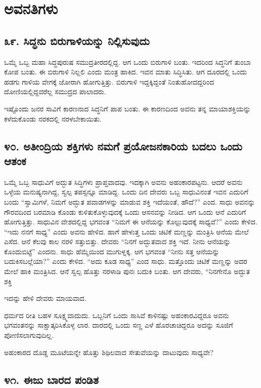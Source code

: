 \chapter{ಅವನತಿಗಳು}

\section{\num{೩೯. } ಸಿದ್ಧನು ಬಿರುಗಾಳಿಯನ್ನು ನಿಲ್ಲಿಸುವುದು}

ಒಮ್ಮೆ ಒಬ್ಬ ಮಹಾ ಸಿದ್ಧಪುರುಷ ಸಮುದ್ರತೀರದಲ್ಲಿದ್ದ. ಆಗ ಒಂದು ಬಿರುಗಾಳಿ ಬಂತು. ಇದರಿಂದ ಸಿದ್ಧನಿಗೆ ತುಂಬಾ ಕೋಪ ಬಂತು. ಈ ಬಿರುಗಾಳಿ ನಿಲ್ಲಲಿ ಎಂದು ಮಂತ್ರ ಹಾಕಿದ. ಇವನ ಮಾತು ಸಿದ್ಧಿಸಿತು. ಆಗ ದೂರದಲ್ಲಿ ಒಂದು ಹಡಗು ಗಾಳಿಯ ವೇಗಕ್ಕೆ ಜೋರಾಗಿ ಹೋಗುತ್ತಿತ್ತು. ಬಿರುಗಾಳಿ ಇದ್ದಕ್ಕಿದ್ದಂತೆ ನಿಂತುಹೋದದ್ದರಿಂದ ದೋಣಿಯಲ್ಲಿದ್ದವರೆಲ್ಲ ಸಮುದ್ರದ ಪಾಲಾದರು.

ಇಷ್ಟೊಂದು ಜನರ ಸಾವಿಗೆ ಕಾರಣನಾದ ಸಿದ್ಧನಿಗೆ ಪಾಪ ಬಂತು. ಈ ಕಾರಣದಿಂದ ಅವನು ತನ್ನ ಮಾಯಾಶಕ್ತಿಯನ್ನು ಕಳೆದುಕೊಂಡು ನರಕದಲ್ಲಿ ನರಳಬೇಕಾಯಿತು.


\section{\num{೪೦. } ಅತೀಂದ್ರಿಯ ಶಕ್ತಿಗಳು ನಮಗೆ ಪ್ರಯೋಜನಕಾರಿಯ ಬದಲು ಒಂದು ಆತಂಕ}

ಒಮ್ಮೆ ಒಬ್ಬ ಸಾಧುವಿಗೆ ಅದ್ಭುತ ಸಿದ್ಧಿಗಳು ಪ್ರಾಪ್ತವಾದವು. ಇದಕ್ಕಾಗಿ ಅವನು ಅಹಂಕಾರಪಟ್ಟನು. ಆದರೆ ಅವನು ಒಳ್ಳೆಯ ಮನುಷ್ಯನಾಗಿದ್ದ, ಸ್ವಲ್ಪ ತಪಸ್ಸನ್ನೂ ಮಾಡಿದ್ದ. ಒಂದು ದಿನ ದೇವರು ಒಬ್ಬ ಸಾಧುವಿನಂತೆ ಇವನ ಎದುರಿಗೆ ಬಂದು “ಸ್ವಾಮಿಗಳೆ, ನಿಮಗೆ ಅದ್ಭುತ ಪವಾಡಗಳನ್ನು ಮಾಡುವ ಶಕ್ತಿ ಇದೆಯಂತೆ, ಹೌದೆ?” ಎಂದ. ಸಾಧು ಅವನನ್ನು ಗೌರವದಿಂದ ಬರಮಾಡಿ ಕೊಂಡು ಕುಳಿತುಕೊಳ್ಳುವುದಕ್ಕೆ ಒಂದು ಆಸನವನ್ನು ನೀಡಿದ. ಆಗ ಒಂದು ಆನೆ ಎದುರಿಗೆ ಹೋಗುತ್ತಿತ್ತು. ಸಾಧುವಿನ ವೇಶದಲ್ಲಿದ್ದ ಭಗವಂತ “ನಿಮಗೆ ಈ ಆನೆಯನ್ನು ಕೊಲ್ಲುವುದಕ್ಕೆ ಸಾಧ್ಯವೆ?” ಎಂದು ಕೇಳಿದ. “ಇದು ನನಗೆ ಸಾಧ್ಯ” ಎಂದು ಅವನು ಹೇಳಿದ. ಹಾಗೆ ಹೇಳುತ್ತ ಒಂದು ಚಿಟಿಕೆ ಮಣ್ಣನ್ನು ಮಂತ್ರಿಸಿ ಆನೆಯ ಮೇಲೆ ಎಸೆದ. ಆನೆ ಕೆಲವು ಕಾಲ ನರಳಿ ಸತ್ತುಬಿತ್ತು. ದೇವರು “ನಿನಗೆ ಅದ್ಭುತವಾದ ಶಕ್ತಿ ಇದೆ. ನೀನು ಆನೆಯನ್ನು ಕೊಂದುಬಿಟ್ಟೆ” ಎಂದನು. ಸಾಧು ಹೆಮ್ಮೆಯಿಂದ ಮುಗುಳ್ನಕ್ಕ. ಆಗ ಭಗವಂತ “ನೀನು ಸತ್ತ ಆನೆಯನ್ನು ಬದುಕಿಸಬಲ್ಲೆಯಾ?” ಎಂದು ಕೇಳಿದ. “ಅದು ಕೂಡ ಸಾಧ್ಯ” ಎಂದ ಸಾಧು. ಮತ್ತೊಂದು ಚಿಟಿಕೆ ಮಣ್ಣನ್ನು ಅದರ ಮೇಲೆ ಹಾಕಿ ಮಂತ್ರಿಸಿದ. ಆನೆ ಸ್ವಲ್ಪ ಹೊತ್ತು ನರಳಾಡಿ ಪುನಃ ಬದುಕಿ ಬಂತು. ಆಗ ದೇವರು, “ನಿನಗೇನೊ ಅದ್ಭುತ ಶಕ್ತಿ

ಇದನ್ನು ಹೇಳಿ ದೇವರು ಮಾಯವಾದ.

ಧರ್ಮದ ರೀತಿ ಬಹಳ ಸೂಕ್ಷ್ಮವಾದುದು. ಒಬ್ಬನಿಗೆ ಒಂದು ಸಾಸಿವೆ ಕಾಳಿನಷ್ಟು ಅಹಂಕಾರವಿದ್ದರೂ ಅವನು ಭಗವಂತನನ್ನು ಸಾಕ್ಷಾತ್ಕರಿಸಿಕೊಳ್ಳ ಲಾರ. ದಾರದಲ್ಲಿ ಒಂದು ಸಣ್ಣ ಎಳೆ ಹೊರಚಾಚಿದ್ದರೂ ಅದನ್ನು ಸೂಜಿಗೆ ಪೋಣಿಸಲಾಗುವುದಿಲ್ಲ.

ಅಹಂಕಾರದ ದೊಡ್ಡ ಮೂಟೆಯನ್ನೇ ಹೊತ್ತು ಶಿಥಿಲವಾದ ಸೇತುವೆಯನ್ನು ದಾಟುವುದು ಸಾಧ್ಯವೇ?


\section{\num{೪೧. } ಈಜು ಬಾರದ ಪಂಡಿತ}


